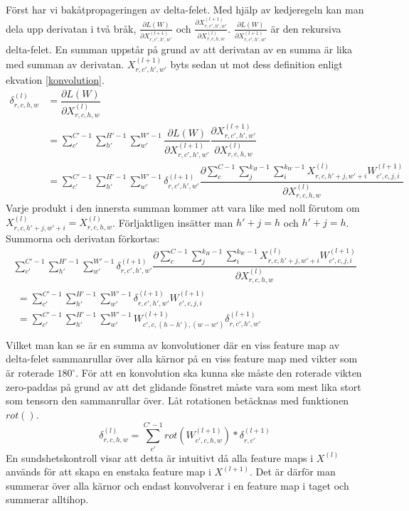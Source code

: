 \documentclass[a4paper,11pt,twoside]{article}
\newcommand*{\pd}[2]{\ensuremath{\dfrac{\partial #1}{\partial #2}}}
\newcommand*{\inpd}[2]{\ensuremath{\frac{\partial #1}{\partial #2}}}
\begin{document}
Först har vi bakåtpropageringen av delta-felet. Med hjälp av kedjeregeln kan man dela upp derivatan i två bråk, $\inpd{L(W)}{X^{(l+1)}_{r,c',h',w'}}$ och $\inpd{X^{(l+1)}_{r,c',h',w'}}{X^{(l)}_{r,c,h,w}}$. $\inpd{L(W)}{X^{(l+1)}_{r,c',h',w'}}$ är den rekursiva delta-felet. En summan uppstår på grund av att derivatan av en summa är lika med summan av derivatan. $X^{(l+1)}_{r,c',h',w'}$ byts sedan ut mot dess definition enligt ekvation \eqref{konvolution}.
\begin{equation}
\begin{split}
	\delta^{(l)}_{r,c,h,w}
		& = \pd{L(W)}{X^{(l)}_{r,c,h,w}} \\
		& = \sum^{C'-1}_{c'} \sum^{H'-1}_{h'} \sum^{W'-1}_{w'} \pd{L(W)}{X^{(l+1)}_{r,c',h',w'}} \pd{X^{(l+1)}_{r,c',h',w'}}{X^{(l)}_{r,c,h,w}} \\
		& = \sum^{C'-1}_{c'} \sum^{H'-1}_{h'} \sum^{W'-1}_{w'} \delta^{(l+1)}_{r,c',h',w'} \pd{\sum^{C-1}_{c} \sum^{k_H-1}_{j} \sum^{k_W-1}_{i} X^{(l)}_{r, c, h'+j, w'+i}W^{(l+1)}_{c', c, j, i}}{X^{(l)}_{r,c,h,w}}
\end{split}
\end{equation}
Varje produkt i den innersta summan kommer att vara like med noll förutom om $X^{(l)}_{r, c, h'+j, w'+i} = X^{(l)}_{r,c,h,w}$. Förljaktligen insätter man $h'+j = h$ och $h'+j = h$. Summorna och derivatan förkortas:
\begin{multline}
\sum^{C'-1}_{c'} \sum^{H'-1}_{h'} \sum^{W'-1}_{w'} \delta^{(l+1)}_{r,c',h',w'} \pd{\sum^{C-1}_{c} \sum^{k_H-1}_{j} \sum^{k_W-1}_{i} X^{(l)}_{r, c, h'+j, w'+i}W^{(l+1)}_{c', c, j, i}}{X^{(l)}_{r,c,h,w}} \\
	\begin{split}
	 = \sum^{C'-1}_{c'} \sum^{H'-1}_{h'} \sum^{W'-1}_{w'} \delta^{(l+1)}_{r,c',h',w'} W^{(l+1)}_{c', c, j, i} \\
	 = \sum^{C'-1}_{c'} \sum^{H'-1}_{h'} \sum^{W'-1}_{w'} W^{(l+1)}_{c', c, (h-h'), (w-w')}  \delta^{(l+1)}_{r,c',h',w'}   \\
	 \end{split}
\end{multline}
Vilket man kan se är en summa av konvolutioner där en viss feature map av delta-felet sammanrullar över alla kärnor på en viss feature map med vikter som är roterade $180^\circ$. För att en konvolution ska kunna ske måste den roterade vikten zero-paddas på grund av att det glidande fönstret måste vara som mest lika stort som tensorn den sammanrullar över. Låt rotationen betäcknas med funktionen $rot()$.
\begin{equation}
\delta^{(l)}_{r,c,h,w} = \sum^{C'-1}_{c'} rot(W^{(l+1)}_{c',c,h,w}) * \delta^{(l+1)}_{r,c'}
\end{equation}
En sundshetskontroll visar att detta är intuitivt då alla feature maps i $X^{(l)}$ används för att skapa en enstaka feature map i $X^{(l+1)}$. Det är därför man summerar över alla kärnor och endast konvolverar i en feature map i taget och summerar alltihop.
\end{document}
